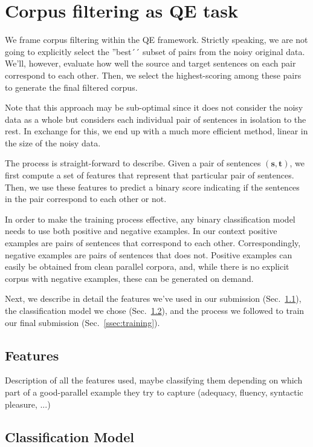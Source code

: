 \section{Corpus filtering as QE task}

We frame corpus filtering within the QE framework. Strictly speaking, we are not going to explicitly select the ''best´´ subset of pairs from the noisy original data. We'll, however, evaluate how well the source and target sentences on each pair correspond to each other. Then, we select the highest-scoring among these pairs to generate the final filtered corpus.

Note that this approach may be sub-optimal since it does not consider the noisy data as a whole but considers each individual pair of sentences in isolation to the rest. In exchange for this, we end up with a much more efficient method, linear in the size of the noisy data.

The process is straight-forward to describe. Given a pair of sentences $(\mathbf{s}, \mathbf{t})$, we first compute a set of features that represent that particular pair of sentences. Then, we use these features to predict a binary score indicating if the sentences in the pair correspond to each other or not. 

In order to make the training process effective, any binary classification model needs to use both positive and negative examples. In our context positive examples are pairs of sentences that correspond to each other. Correspondingly, negative examples are pairs of sentences that does not. Positive examples can easily be obtained from clean parallel corpora, and, while there is no explicit corpus with negative examples, these can be generated on demand. 

Next, we describe in detail the features we've used in our submission (Sec.~\ref{ssec:features}), the classification model we chose (Sec.~\ref{ssec:model}), and the process we followed to train our final submission (Sec.~\ref{ssec:training}).


\subsection{Features}
\label{ssec:features}

Description of all the features used, maybe classifying them depending on which part of a good-parallel example they try to capture (adequacy, fluency, syntactic pleasure, ...)

\subsection{Classification Model}
\label{ssec:model}

